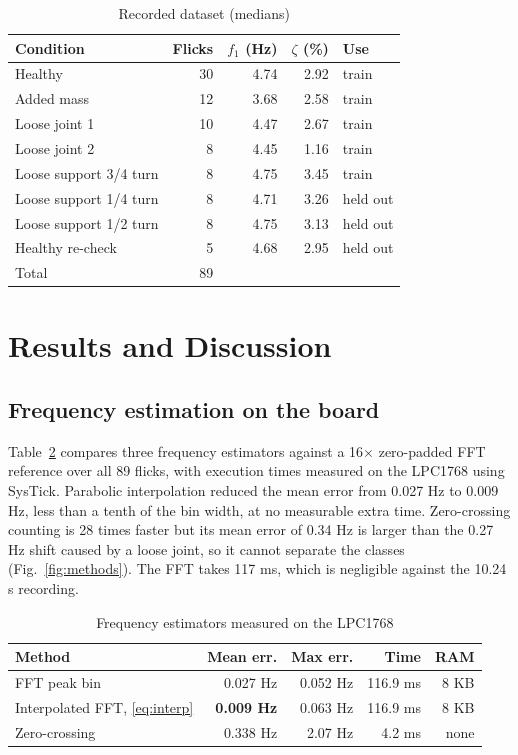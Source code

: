 \documentclass[conference]{IEEEtran}
\begin{document}
\begin{table}[t]
\caption{Recorded dataset (medians)}
\label{tab:data}
\centering
\footnotesize
\setlength{\tabcolsep}{4pt}
\begin{tabular}{@{}lrrrl@{}}
\toprule
Condition & Flicks & $f_1$ (Hz) & $\zeta$ (\%) & Use \\
\midrule
Healthy & 30 & 4.74 & 2.92 & train \\
Added mass & 12 & 3.68 & 2.58 & train \\
Loose joint 1 & 10 & 4.47 & 2.67 & train \\
Loose joint 2 & 8 & 4.45 & 1.16 & train \\
Loose support 3/4 turn & 8 & 4.75 & 3.45 & train \\
Loose support 1/4 turn & 8 & 4.71 & 3.26 & held out \\
Loose support 1/2 turn & 8 & 4.75 & 3.13 & held out \\
Healthy re-check & 5 & 4.68 & 2.95 & held out \\
\midrule
Total & 89 & & & \\
\bottomrule
\end{tabular}
\end{table}

\section{Results and Discussion}
\subsection{Frequency estimation on the board}
Table~\ref{tab:freq} compares three frequency estimators against a 16$\times$ zero-padded FFT reference over all 89 flicks, with execution times measured on the LPC1768 using SysTick. Parabolic interpolation reduced the mean error from 0.027 Hz to 0.009 Hz, less than a tenth of the bin width, at no measurable extra time. Zero-crossing counting is 28 times faster but its mean error of 0.34 Hz is larger than the 0.27 Hz shift caused by a loose joint, so it cannot separate the classes (Fig.~\ref{fig:methods}). The FFT takes 117 ms, which is negligible against the 10.24 s recording.

\begin{table}[t]
\caption{Frequency estimators measured on the LPC1768}
\label{tab:freq}
\centering
\footnotesize
\setlength{\tabcolsep}{4pt}
\begin{tabular}{@{}lrrrr@{}}
\toprule
Method & Mean err. & Max err. & Time & RAM \\
\midrule
FFT peak bin & 0.027 Hz & 0.052 Hz & 116.9 ms & 8 KB \\
Interpolated FFT, \eqref{eq:interp} & \textbf{0.009 Hz} & 0.063 Hz & 116.9 ms & 8 KB \\
Zero-crossing & 0.338 Hz & 2.07 Hz & 4.2 ms & none \\
\bottomrule
\end{tabular}
\end{table}
\end{document}
